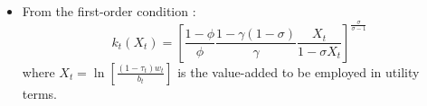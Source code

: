 \documentclass{beamer}
\begin{document}
			\begin{frame}
				\begin{itemize}
					\item From the first-order condition :
					\begin{equation*}
						k_t(X_t) = \left[\frac{1-\phi}{\phi}\frac{1-\gamma(1-\sigma)}{\gamma}\frac{X_t}{1-\sigma X_t}\right]^{\frac{\sigma}{\sigma-1}}
					\end{equation*}
					where $X_t=\ln\left[\frac{(1-\tau_t)w_t}{b_t}\right]$ is the value-added to be employed in utility terms.
				\end{itemize}
			\end{frame}
\end{document}
